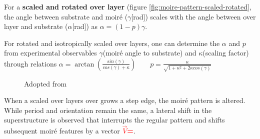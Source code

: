 	For a \textbf{scaled and rotated over layer} (figure \ref{fig:moire-pattern-scaled-rotated}, the angle between substrate and moir\'e ($\gamma$[rad]) scales with the angle between over layer and substrate ($\alpha$[rad]) as $\alpha=(1-p)\gamma$.
	
	For rotated and isotropically scaled over layers, one can determine the $\alpha$ and $p$ from experimental observables $\gamma$(moir\'e angle to substrate) and $\kappa$(scaling factor) through relations $ \alpha=\arctan \left ( \frac{sin(\gamma)}{cos(\gamma)+\kappa} \right )\qquad p=\frac{\kappa}{\sqrt{1+\kappa^2+2\kappa cos(\gamma)}}$
	
	
	\begin{figure} \centering
		\caption{Adopted from \cite{hermann_periodic_2012}}
		\label{fig:moire-pattern}
	\end{figure}
	
	When a scaled over layers over grows a step edge, the moir\'e pattern is altered. While period and orientation remain the same, a lateral shift in the superstructure is observed that interrupts the regular pattern and shifts subsequent moir\'e features by a vector \textcolor{red}{\textbf{$\vec{V}$=}}.
	
